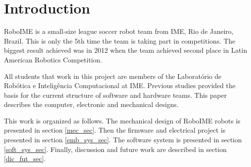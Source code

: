 \section{Introduction}
RoboIME is a small-size league soccer robot team from IME, Rio de Janeiro, Brazil. This
is only the 5th time the team is taking part in competitions. The biggest result achieved was in 2012
when the team achieved second place in Latin American Robotics Competition.

All students that work in this project are members of the Laboratório de Robótica e
Inteligência Computacional at IME. Previous studies \cite{alexandre}\cite{marco} provided
the basis for the current structure of software and hardware teams. This paper describes the
computer, electronic and mechanical designs.

This work is organized as follows. The mechanical design of RoboIME robots is presented in section \ref{mec_sec}. Then the firmware and electrical project is presented in section \ref{emb_sys_sec}. The software system is presented in section \ref{soft_sys_sec}. Finally, discussion and future work are described in section \ref{dic_fut_sec}.
